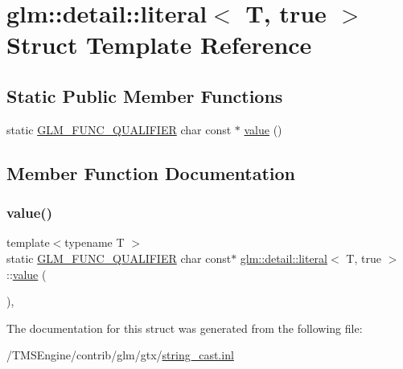 \hypertarget{structglm_1_1detail_1_1literal_3_01_t_00_01true_01_4}{}\section{glm\+:\+:detail\+:\+:literal$<$ T, true $>$ Struct Template Reference}
\label{structglm_1_1detail_1_1literal_3_01_t_00_01true_01_4}
\subsection*{Static Public Member Functions}
\begin{DoxyCompactItemize}
\item 
static \hyperlink{setup_8hpp_a33fdea6f91c5f834105f7415e2a64407}{G\+L\+M\+\_\+\+F\+U\+N\+C\+\_\+\+Q\+U\+A\+L\+I\+F\+I\+ER} char const  $\ast$ \hyperlink{structglm_1_1detail_1_1literal_3_01_t_00_01true_01_4_ae18b91cfeeb373f6b7c62572f88cf239}{value} ()
\end{DoxyCompactItemize}


\subsection{Member Function Documentation}
\mbox{\label{structglm_1_1detail_1_1literal_3_01_t_00_01true_01_4_ae18b91cfeeb373f6b7c62572f88cf239}} 
\subsubsection{\texorpdfstring{value()}{value()}}
{\footnotesize\ttfamily template$<$typename T $>$ \\
static \hyperlink{setup_8hpp_a33fdea6f91c5f834105f7415e2a64407}{G\+L\+M\+\_\+\+F\+U\+N\+C\+\_\+\+Q\+U\+A\+L\+I\+F\+I\+ER} char const$\ast$ \hyperlink{structglm_1_1detail_1_1literal}{glm\+::detail\+::literal}$<$ T, true $>$\+::\hyperlink{_s_d_l__opengl__glext_8h_a8ad81492d410ff2ac11f754f4042150f}{value} (\begin{DoxyParamCaption}{ }\end{DoxyParamCaption})\hspace{0.3cm}{\ttfamily [inline]}, {\ttfamily [static]}}



The documentation for this struct was generated from the following file\+:\begin{DoxyCompactItemize}
\item 
/\+T\+M\+S\+Engine/contrib/glm/gtx/\hyperlink{string__cast_8inl}{string\+\_\+cast.\+inl}\end{DoxyCompactItemize}
